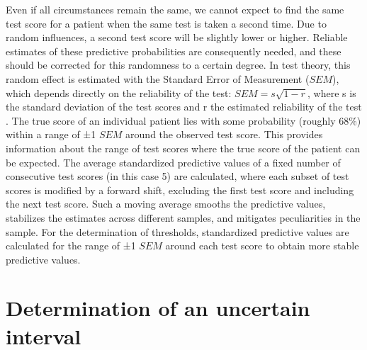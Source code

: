 \documentclass[
  nojss]{jss}
\begin{document}
Even if all circumstances remain the same, we cannot expect to find the
same test score for a patient when the same test is taken a second time.
Due to random influences, a second test score will be slightly lower or
higher. Reliable estimates of these predictive probabilities are
consequently needed, and these should be corrected for this randomness
to a certain degree. In test theory, this random effect is estimated
with the Standard Error of Measurement (\(SEM\)), which depends directly
on the reliability of the test: \(SEM = s \sqrt{1 - r}\), where s is the
standard deviation of the test scores and r the estimated reliability of
the test \citep{crocker_introduction_1986, harvill_standard_1991}. The
true score of an individual patient lies with some probability (roughly
68\%) within a range of ±1 \(SEM\) around the observed test score. This
provides information about the range of test scores where the true score
of the patient can be expected. The average standardized predictive
values of a fixed number of consecutive test scores (in this case 5) are
calculated, where each subset of test scores is modified by a forward
shift, excluding the first test score and including the next test score.
Such a moving average smooths the predictive values, stabilizes the
estimates across different samples, and mitigates peculiarities in the
sample. For the determination of thresholds, standardized predictive
values are calculated for the range of ±1 \(SEM\) around each test score
to obtain more stable predictive values.

\hypertarget{determination-of-an-uncertain-interval}{%
\section{Determination of an uncertain
interval}\label{determination-of-an-uncertain-interval}}
\end{document}
